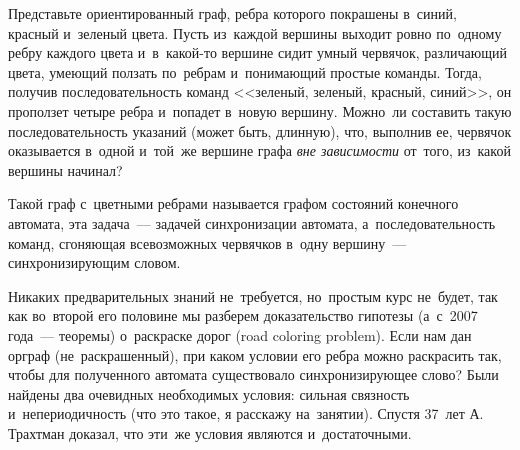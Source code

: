 



Представьте ориентированный граф, ребра которого покрашены в~синий, красный
и~зеленый цвета.
Пусть из~каждой вершины выходит ровно по~одному ребру каждого цвета
и~в~какой-то вершине сидит умный червячок,
различающий цвета, умеющий ползать по~ребрам и~понимающий простые команды.
Тогда, получив последовательность команд <<зеленый, зеленый, красный, синий>>,
он проползет четыре ребра и~попадет в~новую вершину.
Можно~ли составить такую последовательность указаний (может быть, длинную),
что, выполнив ее, червячок оказывается в~одной и~той~же вершине графа
\emph{вне зависимости} от~того, из~какой вершины начинал?

Такой граф с~цветными ребрами называется графом состояний конечного автомата,
эта задача~--- задачей синхронизации автомата, а~последовательность команд,
сгоняющая всевозможных червячков в~одну вершину~--- синхронизирующим словом.

Никаких предварительных знаний не~требуется, но~простым курс не~будет, так как
во~второй его половине мы разберем доказательство гипотезы
(а~с~2007 года~--- теоремы) о~раскраске дорог (road coloring problem).
Если нам дан орграф (не~раскрашенный), при каком условии его ребра можно
раскрасить так, чтобы для полученного автомата существовало синхронизирующее
слово?
Были найдены два очевидных необходимых условия: сильная связность
и~непериодичность (что это такое, я расскажу на~занятии).
Спустя 37~лет А.\,Трахтман доказал, что эти~же условия являются и~достаточными.

